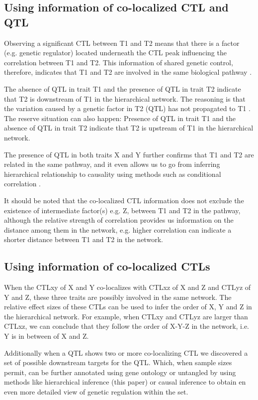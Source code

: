   \subsection{Using information of co-localized CTL and QTL}
  Observing a significant CTL between T1 and T2 means that there is a factor (e.g. genetic regulator) located underneath 
  the CTL peak influencing the correlation between T1 and T2. This information of shared genetic control, therefore, 
  indicates that T1 and T2 are involved in the same biological pathway \cite{Tesson:2010}.

  The absence of QTL in trait T1 and the presence of QTL in trait T2 indicate that T2 is downstream of T1 in the 
  hierarchical network. The reasoning is that the variation caused by a genetic factor in T2 (QTL) has not 
  propagated to T1 \cite{Jansen:2009}. The reserve situation can also happen: Presence of QTL in trait T1 and the 
  absence of QTL in trait T2 indicate that T2 is upstream of T1 in the hierarchical network.

  The presence of QTL in both traits X and Y further confirms that T1 and T2 are related in the same pathway, and it 
  even allows us to go from inferring hierarchical relationship to causality using methods such as conditional 
  correlation \cite{Schadt:2007, Li:2010}.

  It should be noted that the co-localized CTL information does not exclude the existence of intermediate factor(s) 
  e.g. Z,  between T1 and T2 in the pathway, although the relative strength of correlation provides us 
  information on the distance among them in the network, e.g. higher correlation can indicate a shorter distance 
  between T1 and T2 in the network.\\

  \subsection{Using information of co-localized CTLs}
  When the CTLxy of X and Y co-localizes with CTLxz of X and Z and CTLyz of Y and Z, these three traits are possibly 
  involved in the same network. The relative effect sizes of these CTLs can be used to infer the order of X, Y and Z
  in the hierarchical network. For example, when CTLxy and CTLyz are larger than CTLxz, we can conclude that they 
  follow the order of X-Y-Z in the network, i.e. Y is in between of X and Z.

  Additionally when a QTL shows two or more co-localizing CTL we discovered a set of possible downstream targets 
  for the QTL. Which, when sample sizes permit, can be further annotated using gene ontology \cite{GeneOntology:2000} or 
  untangled by using methods like hierarchical inference (this paper) or causal inference \cite{Schadt:2005, Li:2006} 
  to obtain en even more detailed view of genetic regulation within the set.

